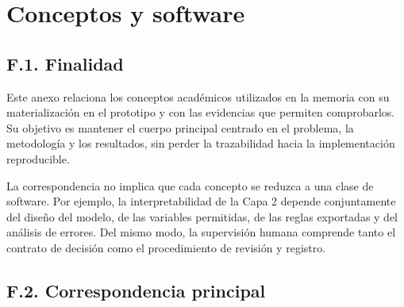 \chapter{Conceptos y software}
\label{cap:anexof}

\section*{F.1. Finalidad}

Este anexo relaciona los conceptos académicos utilizados en la memoria con su
materialización en el prototipo y con las evidencias que permiten comprobarlos. Su
objetivo es mantener el cuerpo principal centrado en el problema, la metodología y los
resultados, sin perder la trazabilidad hacia la implementación reproducible.

La correspondencia no implica que cada concepto se reduzca a una clase de software.
Por ejemplo, la interpretabilidad de la Capa 2 depende conjuntamente del diseño del
modelo, de las variables permitidas, de las reglas exportadas y del análisis de errores.
Del mismo modo, la supervisión humana comprende tanto el contrato de decisión como el
procedimiento de revisión y registro.

\section*{F.2. Correspondencia principal}

